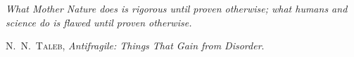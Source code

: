 \thispagestyle{empty}
\cleardoublepage
\thispagestyle{empty}
\vspace*{3cm}
\def\epigraphwidth{200pt}
\epigraph{
\textit{What Mother Nature does is rigorous until proven otherwise; what humans and science do is flawed until proven otherwise.}
}{\textsc{N.\ N.\ Taleb}, \textit{Antifragile: Things That Gain from Disorder}.}

